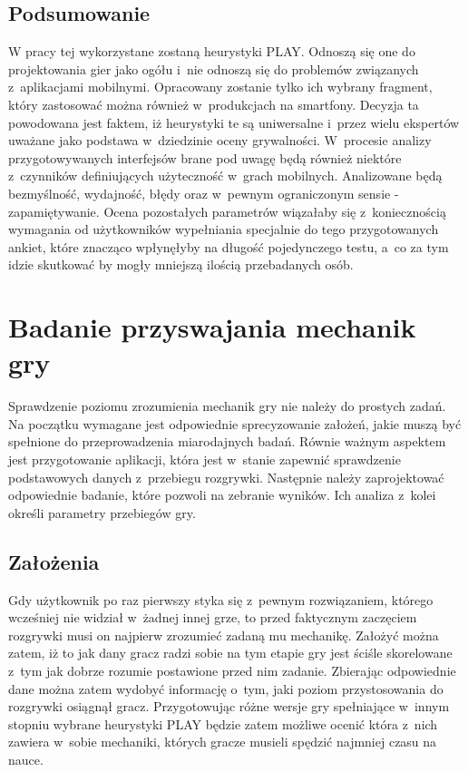 \documentclass[a4paper,12pt,numbers=noenddot]{report}
\begin{document}
\section{Podsumowanie}
W pracy tej wykorzystane zostaną heurystyki PLAY. Odnoszą się one do projektowania gier jako ogółu i~nie odnoszą się do problemów związanych z~aplikacjami mobilnymi. Opracowany zostanie tylko ich wybrany fragment, który zastosować można również w~produkcjach na smartfony. Decyzja ta powodowana jest faktem, iż heurystyki te są uniwersalne i~przez wielu ekspertów uważane jako podstawa w~dziedzinie oceny grywalności. W~procesie analizy przygotowywanych interfejsów brane pod uwagę będą również niektóre z~czynników definiujących użyteczność w~grach mobilnych. Analizowane będą bezmyślność, wydajność, błędy oraz w~pewnym ograniczonym sensie - zapamiętywanie. Ocena pozostałych parametrów wiązałaby się z~koniecznością wymagania od użytkowników wypełniania specjalnie do tego przygotowanych ankiet, które znacząco wpłynęłyby na długość pojedynczego testu, a~co za tym idzie skutkować by mogły mniejszą ilością przebadanych osób.

\chapter{Badanie przyswajania mechanik gry}
Sprawdzenie poziomu zrozumienia mechanik gry nie należy do prostych zadań. Na początku wymagane jest odpowiednie sprecyzowanie założeń, jakie muszą być spełnione do przeprowadzenia miarodajnych badań. Równie ważnym aspektem jest przygotowanie aplikacji, która jest w~stanie zapewnić sprawdzenie podstawowych danych z~przebiegu rozgrywki. Następnie należy zaprojektować odpowiednie badanie, które pozwoli na zebranie wyników. Ich analiza z~kolei określi parametry przebiegów gry.
\section{Założenia}
Gdy użytkownik po raz pierwszy styka się z~pewnym rozwiązaniem, którego wcześniej nie widział w~żadnej innej grze, to przed faktycznym zaczęciem rozgrywki musi on najpierw zrozumieć zadaną mu mechanikę. Założyć można zatem, iż to jak dany gracz radzi sobie na tym etapie gry jest ściśle skorelowane z~tym jak dobrze rozumie postawione przed nim zadanie. Zbierając odpowiednie dane można zatem wydobyć informację o~tym, jaki poziom przystosowania do rozgrywki osiągnął gracz. Przygotowując różne wersje gry spełniające w~innym stopniu wybrane heurystyki PLAY będzie zatem możliwe ocenić która z~nich zawiera w~sobie mechaniki, których gracze musieli spędzić najmniej czasu na nauce.
\end{document}
